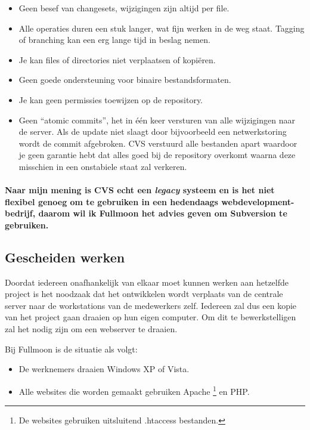 \documentclass[12pt,a4paper]{article}
\begin{document}
    \begin{itemize}
      \item Geen besef van changesets, wijzigingen zijn altijd per file.
      \item Alle operaties duren een stuk langer, wat fijn werken in de weg staat. Tagging of branching kan een erg lange tijd in beslag nemen.
      \item Je kan files of directories niet verplaatsen of kopi\"{e}ren.
      \item Geen goede ondersteuning voor binaire bestandsformaten.
      \item Je kan geen permissies toewijzen op de repository.
      \item Geen ``atomic commits'', het in \'{e}\'{e}n keer versturen van alle wijzigingen naar de server. Als de update niet slaagt door bijvoorbeeld een netwerkstoring wordt de commit afgebroken. CVS verstuurd alle bestanden apart waardoor je geen garantie hebt dat alles goed bij de repository overkomt waarna deze misschien in een onstabiele staat zal verkeren.
    \end{itemize}
    
    \paragraph{Naar mijn mening is CVS echt een \emph{legacy} systeem en is het niet flexibel genoeg om te gebruiken in een hedendaags webdevelopment-bedrijf, daarom wil ik Fullmoon het advies geven om Subversion te gebruiken.}
    
    \subsection{Gescheiden werken}
    
    Doordat iedereen onafhankelijk van elkaar moet kunnen werken aan hetzelfde project is het noodzaak dat het ontwikkelen wordt verplaats van de centrale server naar de workstations van de medewerkers zelf. Iedereen zal dus een kopie van het project gaan draaien op hun eigen computer. Om dit te bewerkstelligen zal het nodig zijn om een webserver te draaien.
    
    Bij Fullmoon is de situatie als volgt:
    
    \begin{itemize}
      \item De werknemers draaien Windows XP of Vista.
      \item Alle websites die worden gemaakt gebruiken Apache \footnote{De websites gebruiken uitsluitend .htaccess bestanden.} en PHP.
    \end{itemize}
    
\end{document}
